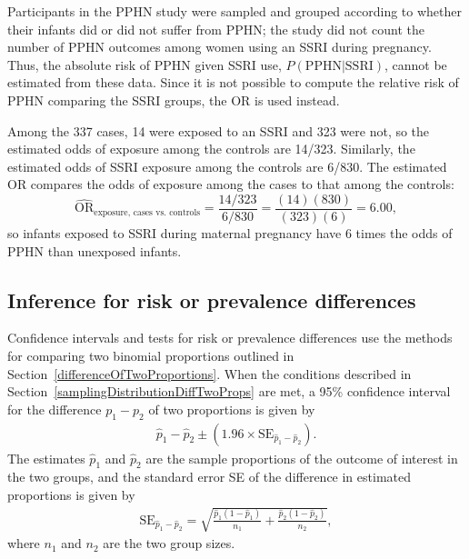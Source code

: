 Participants in the PPHN study were sampled and grouped according to whether their infants did or did not suffer from PPHN; the study did not count the number of PPHN outcomes among women using an SSRI during pregnancy. Thus, the absolute risk of PPHN given SSRI use, $P(\text{PPHN} | \text{SSRI})$, cannot be estimated from these data.  Since it is not possible to compute the relative risk of PPHN comparing the SSRI groups, the OR is used instead.

Among the 337 cases, 14 were exposed to an SSRI and 323 were not, so the estimated odds of exposure among the controls are 14/323.  Similarly, the estimated odds of SSRI exposure among the controls are 6/830. The estimated OR compares the odds of exposure among the cases to that among the controls:
\[
\widehat{\text{OR}}_{\text{exposure, cases vs. controls}} =  \frac{14/323}{6/830} = \frac{(14)(830)}{(323)(6)} =  6.00,
\]
so infants exposed to SSRI during maternal pregnancy have 6 times the odds of PPHN than unexposed infants.

\subsection{Inference for risk or prevalence differences}
\label{inferenceRiskDifference}

Confidence intervals and tests for risk or prevalence differences use the methods for comparing two binomial proportions outlined in Section~\ref{differenceOfTwoProportions}. When the conditions described in Section~\ref{samplingDistributionDiffTwoProps} are met, a 95\% confidence interval for the difference $p_1 - p_2$ of two proportions is given by
\begin{align*}
  \hat{p}_1 - \hat{p}_2 \pm ( 1.96 \times \text{SE}_{\hat{p}_1 - \hat{p}_2}).
\end{align*}
The estimates $\hat{p}_1$ and $\hat{p}_2$ are the sample proportions of the outcome of interest in the two groups, and the standard error SE of the difference in estimated proportions is given by
\begin{align*}
  \text{SE}_{\hat{p}_1 - \hat{p}_2}
= \sqrt{\frac{\hat{p}_1(1-\hat{p}_1)}{n_1} + \frac{\hat{p}_2(1-\hat{p}_2)}{n_2}},
\end{align*}
where $n_1$ and $n_2$ are the two group sizes.

